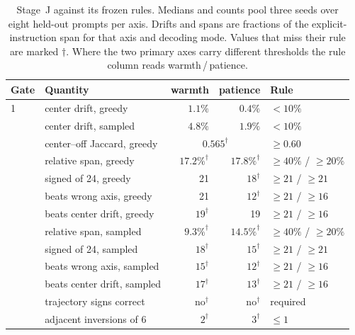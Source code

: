 \documentclass[10pt]{article}
\begin{document}
\begin{table}[t]
\centering
\caption{Stage~J against its frozen rules. Medians and counts pool three seeds
over eight held-out prompts per axis. Drifts and spans are fractions of the
explicit-instruction span for that axis and decoding mode. Values that miss
their rule are marked $\dagger$. Where the two primary axes carry different
thresholds the rule column reads warmth\,/\,patience.}
\label{tab:stagej}
\begin{tabular}{llrrl}
\toprule
Gate & Quantity & warmth & patience & Rule \\
\midrule
1 & center drift, greedy         & $1.1\%$ & $0.4\%$ & $<10\%$ \\
  & center drift, sampled        & $4.8\%$ & $1.9\%$ & $<10\%$ \\
  & center--off Jaccard, greedy  & \multicolumn{2}{c}{$0.565^{\dagger}$} & $\geq 0.60$ \\
\addlinespace
2 & relative span, greedy        & $17.2\%^{\dagger}$ & $17.8\%^{\dagger}$ & $\geq 40\%$ / $\geq 20\%$ \\
  & signed of 24, greedy         & 21 & $18^{\dagger}$ & $\geq 21$ / $\geq 21$ \\
  & beats wrong axis, greedy     & 21 & $12^{\dagger}$ & $\geq 21$ / $\geq 16$ \\
  & beats center drift, greedy   & $19^{\dagger}$ & 19 & $\geq 21$ / $\geq 16$ \\
\addlinespace
  & relative span, sampled       & $9.3\%^{\dagger}$ & $14.5\%^{\dagger}$ & $\geq 40\%$ / $\geq 20\%$ \\
  & signed of 24, sampled        & $18^{\dagger}$ & $15^{\dagger}$ & $\geq 21$ / $\geq 21$ \\
  & beats wrong axis, sampled    & $15^{\dagger}$ & $12^{\dagger}$ & $\geq 21$ / $\geq 16$ \\
  & beats center drift, sampled  & $17^{\dagger}$ & $13^{\dagger}$ & $\geq 21$ / $\geq 16$ \\
\addlinespace
3 & trajectory signs correct     & no$^{\dagger}$ & no$^{\dagger}$ & required \\
  & adjacent inversions of 6     & $2^{\dagger}$ & $3^{\dagger}$ & $\leq 1$ \\
\bottomrule
\end{tabular}
\end{table}
\end{document}
